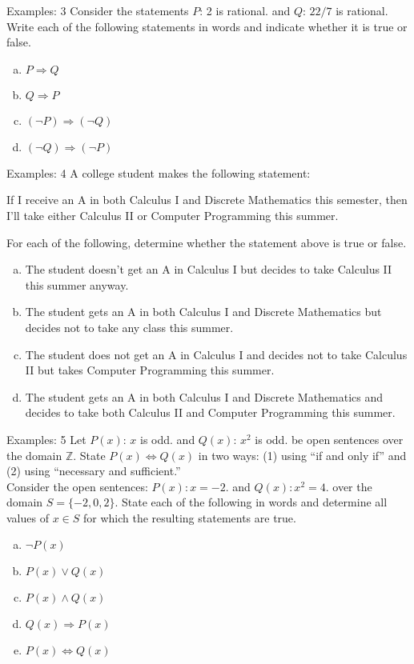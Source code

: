 \documentclass{beamer}
\begin{document}
\begin{frame}{Examples: 3}
Consider the statements $P$: 2 is rational. and $Q$: $22/7$ is rational.
Write each of the following statements in words and indicate whether it is true or false.
\begin{enumerate}[(a)]
    \item $P \Rightarrow Q$
    \item $Q \Rightarrow P$
    \item $(\neg P) \Rightarrow (\neg Q)$
    \item $(\neg Q) \Rightarrow (\neg P)$
\end{enumerate}
\end{frame}

\begin{frame}{Examples: 4}
A college student makes the following statement:
\begin{center}
    If I receive an A in both Calculus I and Discrete Mathematics this semester, then I'll take either Calculus II or Computer Programming this summer.
\end{center}
For each of the following, determine whether the statement above is true or false.
\begin{enumerate}[(a)]
    \item The student doesn't get an A in Calculus I but decides to take Calculus II this summer anyway.
    \item The student gets an A in both Calculus I and Discrete Mathematics but decides not to take any class this summer.
    \item The student does not get an A in Calculus I and decides not to take Calculus II but takes Computer Programming this summer.
    \item The student gets an A in both Calculus I and Discrete Mathematics and decides to take both Calculus II and Computer Programming this summer.

\end{enumerate}
\end{frame}

\begin{frame}{Examples: 5}
Let $P(x)$: $x$ is odd. and $Q(x)$: $x^2$ is odd. be open sentences over the domain $\mathbb{Z}$. State $P(x) \Leftrightarrow Q(x)$ in two ways: (1) using ``if and only if'' and (2) using ``necessary and sufficient.''\\

Consider the open sentences:
$P(x) : x = -2$. and $Q(x) : x^2 = 4$.
over the domain $S = \{-2, 0, 2\}$. State each of the following in words and determine all values of $x \in S$ for which the resulting statements are true.
\begin{enumerate}[(a)]
    \item $\neg P(x)$
    \item $P(x) \lor Q(x)$
    \item $P(x) \land Q(x)$
    \item $Q(x) \Rightarrow P(x)$
    \item $P(x) \Leftrightarrow Q(x)$
\end{enumerate}

\end{frame}
\end{document}
